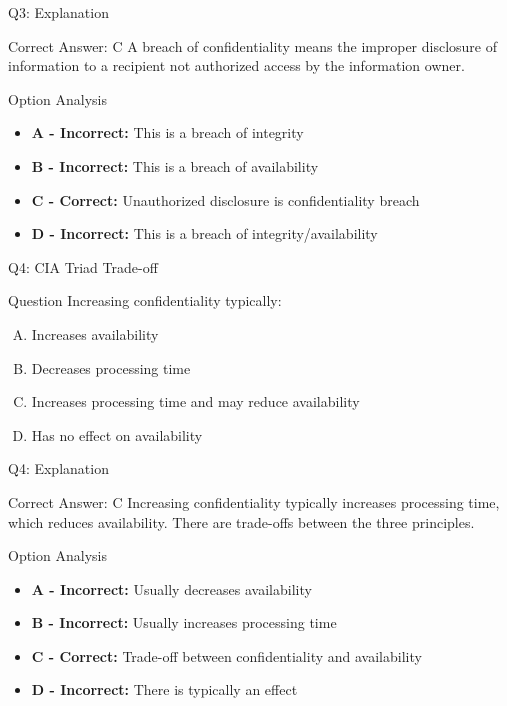 \documentclass{beamer}
\begin{document}
	\begin{frame}{Q3: Explanation}
		\begin{block}{Correct Answer: C}
			A breach of confidentiality means the improper disclosure of information to a recipient not authorized access by the information owner.
		\end{block}
		\begin{block}{Option Analysis}
			\begin{itemize}
				\item \textbf{A - Incorrect:} This is a breach of integrity
				\item \textbf{B - Incorrect:} This is a breach of availability
				\item \textbf{C - Correct:} Unauthorized disclosure is confidentiality breach
				\item \textbf{D - Incorrect:} This is a breach of integrity/availability
			\end{itemize}
		\end{block}
	\end{frame}
	
	\begin{frame}{Q4: CIA Triad Trade-off}
		\begin{block}{Question}
			Increasing confidentiality typically:
		\end{block}
		\begin{enumerate}[(A)]
			\item Increases availability
			\item Decreases processing time
			\item Increases processing time and may reduce availability
			\item Has no effect on availability
		\end{enumerate}
	\end{frame}
	
	\begin{frame}{Q4: Explanation}
		\begin{block}{Correct Answer: C}
			Increasing confidentiality typically increases processing time, which reduces availability. There are trade-offs between the three principles.
		\end{block}
		\begin{block}{Option Analysis}
			\begin{itemize}
				\item \textbf{A - Incorrect:} Usually decreases availability
				\item \textbf{B - Incorrect:} Usually increases processing time
				\item \textbf{C - Correct:} Trade-off between confidentiality and availability
				\item \textbf{D - Incorrect:} There is typically an effect
			\end{itemize}
		\end{block}
	\end{frame}
	
\end{document}
